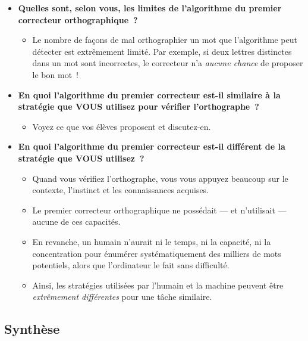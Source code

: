 \documentclass[12pt,a4paper]{article}
\begin{document}
\begin{thinkbox}
  \begin{itemize}
    \item \textbf{Quelles sont, selon vous, les limites de l'algorithme du premier correcteur orthographique~?}
    \begin{itemize}
      \item Le nombre de façons de mal orthographier un mot que l'algorithme peut détecter est extrêmement limité. Par exemple, si deux lettres distinctes dans un mot sont incorrectes, le correcteur n'a \emph{aucune chance} de proposer le bon mot~!
    \end{itemize}
    \item \textbf{En quoi l'algorithme du premier correcteur est-il similaire à la stratégie que VOUS utilisez pour vérifier l'orthographe~?}
    \begin{itemize}
      \item Voyez ce que vos élèves proposent et discutez-en.
    \end{itemize}
    \item \textbf{En quoi l'algorithme du premier correcteur est-il différent de la stratégie que VOUS utilisez~?}
    \begin{itemize}
      \item Quand vous vérifiez l'orthographe, vous vous appuyez beaucoup sur le contexte, l'instinct et les connaissances acquises.
      \item Le premier correcteur orthographique ne possédait — et n'utilisait — aucune de ces capacités.
      \item En revanche, un humain n'aurait ni le temps, ni la capacité, ni la concentration pour énumérer systématiquement des milliers de mots potentiels, alors que l'ordinateur le fait sans difficulté.
      \item Ainsi, les stratégies utilisées par l'humain et la machine peuvent être \emph{extrêmement différentes} pour une tâche similaire.
    \end{itemize}
  \end{itemize}
\end{thinkbox}

\subsection{Synthèse}
\end{document}
